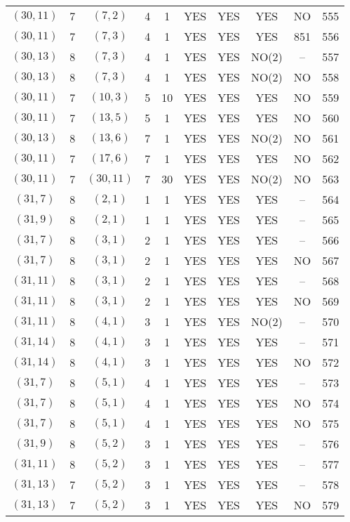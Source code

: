 \begin{longtable}{|c|c|c|c|c|c|c|c|c|c|}
$(30, 11)$ & 7 & $(7, 2)$ & 4 & 1 & YES & YES & YES & NO & 555\\
$(30, 11)$ & 7 & $(7, 3)$ & 4 & 1 & YES & YES & YES & 851 & 556\\
$(30, 13)$ & 8 & $(7, 3)$ & 4 & 1 & YES & YES & NO(2) & -- & 557\\
$(30, 13)$ & 8 & $(7, 3)$ & 4 & 1 & YES & YES & NO(2) & NO & 558\\
$(30, 11)$ & 7 & $(10, 3)$ & 5 & 10 & YES & YES & YES & NO & 559\\
$(30, 11)$ & 7 & $(13, 5)$ & 5 & 1 & YES & YES & YES & NO & 560\\
$(30, 13)$ & 8 & $(13, 6)$ & 7 & 1 & YES & YES & NO(2) & NO & 561\\
$(30, 11)$ & 7 & $(17, 6)$ & 7 & 1 & YES & YES & YES & NO & 562\\
$(30, 11)$ & 7 & $(30, 11)$ & 7 & 30 & YES & YES & NO(2) & NO & 563\\
$(31, 7)$ & 8 & $(2, 1)$ & 1 & 1 & YES & YES & YES & -- & 564\\
$(31, 9)$ & 8 & $(2, 1)$ & 1 & 1 & YES & YES & YES & -- & 565\\
$(31, 7)$ & 8 & $(3, 1)$ & 2 & 1 & YES & YES & YES & -- & 566\\
$(31, 7)$ & 8 & $(3, 1)$ & 2 & 1 & YES & YES & YES & NO & 567\\
$(31, 11)$ & 8 & $(3, 1)$ & 2 & 1 & YES & YES & YES & -- & 568\\
$(31, 11)$ & 8 & $(3, 1)$ & 2 & 1 & YES & YES & YES & NO & 569\\
$(31, 11)$ & 8 & $(4, 1)$ & 3 & 1 & YES & YES & NO(2) & -- & 570\\
$(31, 14)$ & 8 & $(4, 1)$ & 3 & 1 & YES & YES & YES & -- & 571\\
$(31, 14)$ & 8 & $(4, 1)$ & 3 & 1 & YES & YES & YES & NO & 572\\
$(31, 7)$ & 8 & $(5, 1)$ & 4 & 1 & YES & YES & YES & -- & 573\\
$(31, 7)$ & 8 & $(5, 1)$ & 4 & 1 & YES & YES & YES & NO & 574\\
$(31, 7)$ & 8 & $(5, 1)$ & 4 & 1 & YES & YES & YES & NO & 575\\
$(31, 9)$ & 8 & $(5, 2)$ & 3 & 1 & YES & YES & YES & -- & 576\\
$(31, 11)$ & 8 & $(5, 2)$ & 3 & 1 & YES & YES & YES & -- & 577\\
$(31, 13)$ & 7 & $(5, 2)$ & 3 & 1 & YES & YES & YES & -- & 578\\
$(31, 13)$ & 7 & $(5, 2)$ & 3 & 1 & YES & YES & YES & NO & 579\\

\end{longtable}

